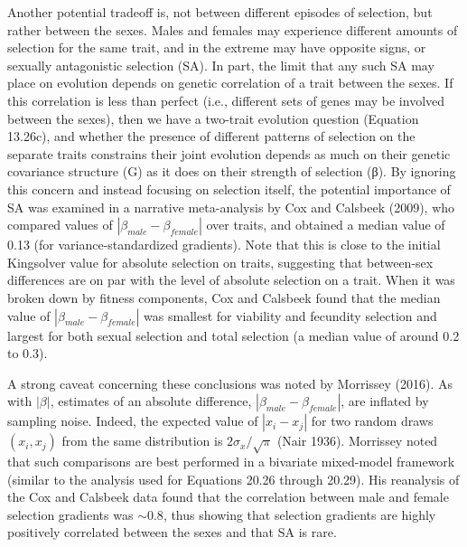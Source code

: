 \documentclass{article}
\begin{document}
Another potential tradeoff is, not between different episodes of selection, but rather between the sexes. Males and females may experience different amounts of selection for the same trait, and in the extreme may have opposite signs, or sexually antagonistic selection (SA). In part, the limit that any such SA may place on evolution depends on genetic correlation of a trait between the sexes. If this correlation is less than perfect (i.e., different sets of genes may be involved between the sexes), then we have a two-trait evolution question (Equation 13.26c), and whether the presence of different patterns of selection on the separate traits constrains their joint evolution depends as much on their genetic covariance structure (G) as it does on their strength of selection (β). By ignoring this concern and instead focusing on selection itself, the potential importance of SA was examined in a narrative meta-analysis by Cox and Calsbeek (2009), who compared values of  $ |\beta_{male} - \beta_{female}| $ over traits, and obtained a median value of 0.13 (for variance-standardized gradients). Note that this is close to the initial Kingsolver value for absolute selection on traits, suggesting that between-sex differences are on par with the level of absolute selection on a trait. When it was broken down by fitness components, Cox and Calsbeek found that the median value of  $ |\beta_{male} - \beta_{female}| $ was smallest for viability and fecundity selection and largest for both sexual selection and total selection (a median value of around 0.2 to 0.3).

A strong caveat concerning these conclusions was noted by Morrissey (2016). As with  $ \left|\beta\right| $, estimates of an absolute difference,  $ \left|\beta_{male} - \beta_{female}\right| $, are inflated by sampling noise. Indeed, the expected value of  $ \left|x_{i} - x_{j}\right| $ for two random draws  $ (x_{i}, x_{j}) $ from the same distribution is  $ 2\sigma_{x}/\sqrt{\pi} $ (Nair 1936). Morrissey noted that such comparisons are best performed in a bivariate mixed-model framework (similar to the analysis used for Equations 20.26 through 20.29). His reanalysis of the Cox and Calsbeek data found that the correlation between male and female selection gradients was  $ \sim0.8 $, thus showing that selection gradients are highly positively correlated between the sexes and that SA is rare.
\end{document}
